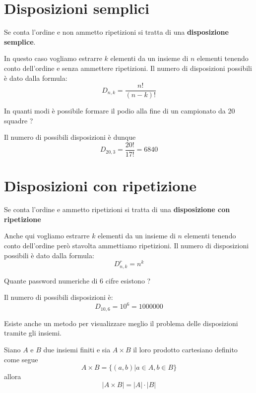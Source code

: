 \section{Disposizioni semplici}
\begin{defn}
	Se conta l'ordine e non ammetto ripetizioni si tratta di una \textbf{disposizione semplice}.
\end{defn}

In questo caso vogliamo estrarre $k$ elementi da un insieme di $n$ elementi tenendo conto
dell'ordine e senza ammettere ripetizioni.
Il numero di disposizioni possibili \`e dato dalla formula:
\begin{equation*}
	D_{n, k} = \frac{n!}{(n - k)!}
\end{equation*}

\begin{example}
	In quanti modi \`e possibile formare il podio alla fine di un campionato da 20 squadre ?

	Il numero di possibili disposizioni \`e dunque
	\begin{equation*}
		D_{20, 3} = \frac{20!}{17!} = 6840
	\end{equation*}
\end{example}

\section{Disposizioni con ripetizione}
\begin{defn}
	Se conta l'ordine e ammetto ripetizioni si tratta di una \textbf{disposizione con ripetizione}
\end{defn}

Anche qui vogliamo estrarre $k$ elementi da un insieme di $n$ elementi tenendo conto dell'ordine
per\`o stavolta ammettiamo ripetizioni.
Il numero di disposizioni possibili \`e dato dalla formula:
\begin{equation*}
	D_{n, k}^r = n^k
\end{equation*}

\begin{example}
	Quante password numeriche di 6 cifre esistono ?

	Il numero di possibili disposizioni \`e:
	\begin{equation*}
		D_{10, 6} = 10^6 = 1000000
	\end{equation*}
\end{example}

Esiste anche un metodo per visualizzare meglio il problema delle disposizioni tramite gli insiemi.
\begin{theorem}
	Siano $A$ e $B$ due insiemi finiti e sia $A \times B$ il loro prodotto cartesiano definito
	come segue
	\begin{equation*}
		A \times B = \{ (a, b) | a \in A, b \in B \}
	\end{equation*}
	allora
	\begin{equation*}
		|A \times B| = |A| \cdot |B|
	\end{equation*}
\end{theorem}

